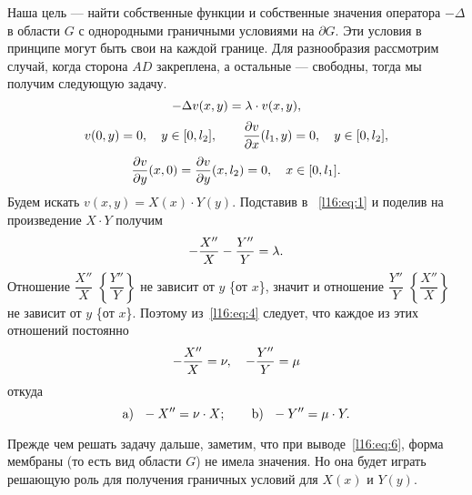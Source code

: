 Наша цель --- найти собственные функции и собственные значения оператора $-\Delta$ в области $G$ с однородными граничными условиями на $\partial G$. Эти условия в принципе могут быть свои на каждой границе. Для разнообразия рассмотрим случай, когда сторона $AD$ закреплена, а остальные --- свободны, тогда мы получим следующую задачу.
\begin{equation}\label{l16:eq:1}
	\hfill-\Delta v(x,y)=\lambda\cdot v(x,y),\hfill
\end{equation}  
\begin{equation}\label{l16:eq:2}
	\hfill v(0,y)=0,\quad y\in[0,l_2],\qquad \pder{v}{x}(l_1,y)=0,\quad y\in[0,l_2],\hfill
\end{equation}
\begin{equation}\label{l16:eq:3}
	\hfill \pder{v}{y}(x,0)=\pder{v}{y}(x,l_2)=0,\quad  x\in[0,l_1].\hfill
\end{equation}
Будем искать $v(x,y)=X(x)\cdot Y(y)$. Подставив в ~\eqref{l16:eq:1} и поделив на произведение $X\cdot Y$ получим 
\begin{equation}\label{l16:eq:4}
	\hfill-\frac{X''}{X}-\frac{Y''}{Y}=\lambda.\hfill
\end{equation}
Отношение $\dfrac{X''}{X}$ $\left\{\dfrac{Y''}{Y}\right\}$ не зависит от $y$ \{от $x$\}, значит и отношение $\dfrac{Y''}{Y}$ $\left\{\dfrac{X''}{X}\right\}$ не зависит от $y$ \{от $x$\}. Поэтому из~\eqref{l16:eq:4} следует, что каждое из этих отношений постоянно
\begin{equation}\label{l16:eq:5}
	\hfill-\frac{X''}{X}=\nu,\quad-\frac{Y''}{Y}=\mu\hfill
\end{equation} 
откуда
\begin{equation}\label{l16:eq:6}
	\hfill\text{a)}\ \ -X''=\nu\cdot X;\qquad\text{b)}\ \ -Y''=\mu\cdot Y.\hfill
\end{equation}

Прежде чем решать задачу дальше, заметим, что при выводе~\eqref{l16:eq:6},  форма мембраны (то есть вид области $G$) не имела значения. Но она будет играть решающую роль для получения граничных условий для $X(x)$ и $Y(y)$.


